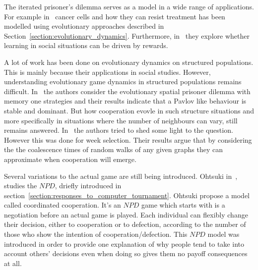 \documentclass{article}
\theoremstyle{definition}
\begin{document}
The iterated prisoner's dilemma serves as a model in a wide range of applications.
For example in~\cite{Kaznatchee2017} cancer cells and how they can resist treatment has been
modelled using evolutionary approaches described in Section~\ref{section:evolutionary_dynamics}.
Furthermore, in~\cite{Dridi2018} they explore whether learning in social situations
can be driven by rewards.

A lot of work has been done on evolutionary dynamics on structured populations.
This is mainly because their applications in social studies. However, understanding
evolutionary game dynamics in structured populations remains difficult.
In~\cite{Liu2017} the authors consider the evolutionary spatial prisoner dilemma with
memory one strategies and their results indicate that a Pavlov like behaviour
is stable and dominant. But how cooperation evovle in such structure situations
and more specifically in situations where the number of neighbours can vary,
still remains answered. In~\cite{Allen2017} the authors tried to shed some light to the
question. However this was done for week selection. Their results argue that by
considering the the coalescence times of random walks of any given graphs they can
approximate when cooperation will emerge.

Several variations to the actual game are still being introduced. Ohtsuki in~\cite{Ohtsuki2018},
studies the \(NPD\), driefly introduced in section~\ref{section:responses_to_computer_tournament}.
Ohtsuki propose a model called coordinated cooperation. It's an \(NPD\) game
which starts with is a negotiation before an actual game is played. Each individual
can flexibly change their decision, either to cooperation or to defection,
according to the number of those who show the intention of cooperation/defection.
This \(NPD\) model was introduced in order to provide one explanation of why
people tend to take into account others' decisions even when doing so gives them
no payoff consequences at all.



\end{document}
